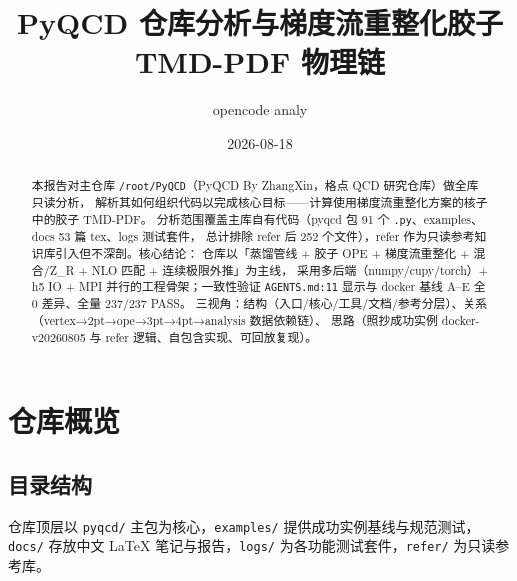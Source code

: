 \documentclass[UTF8]{ctexart}
\title{PyQCD 仓库分析与梯度流重整化胶子 TMD-PDF 物理链}
\author{opencode analy}
\date{2026-08-18}
\begin{document}
\maketitle
\sloppy

\begin{abstract}
本报告对主仓库 \texttt{/root/PyQCD}（PyQCD By ZhangXin，格点 QCD 研究仓库）做全库只读分析，
解析其如何组织代码以完成核心目标——\textcolor{struct}{计算使用梯度流重整化方案的核子中的胶子 TMD-PDF}。
分析范围覆盖主库自有代码（pyqcd 包 91 个 \texttt{.py}、examples、docs 53 篇 tex、logs 测试套件，
总计排除 refer 后 252 个文件），refer 作为只读参考知识库引入但不深剖。核心结论：
仓库以「蒸馏管线 + 胶子 OPE + 梯度流重整化 + 混合/Z\_R + NLO 匹配 + 连续极限外推」为主线，
采用多后端（numpy/cupy/torch）+ h5 IO + MPI 并行的工程骨架；一致性验证
\textcolor{evidence}{\nolinkurl{AGENTS.md:11}} 显示与 docker 基线 A–E 全 0 差异、全量 237/237 PASS。
三视角：结构（入口/核心/工具/文档/参考分层）、关系（vertex→2pt→ope→3pt→4pt→analysis 数据依赖链）、
思路（照抄成功实例 docker-v20260805 与 refer 逻辑、自包含实现、可回放复现）。
\end{abstract}

\tableofcontents

\section{仓库概览}
\subsection{目录结构}
仓库顶层以 \texttt{pyqcd/} 主包为核心，\texttt{examples/} 提供成功实例基线与规范测试，
\texttt{docs/} 存放中文 LaTeX 笔记与报告，\texttt{logs/} 为各功能测试套件，\texttt{refer/} 为只读参考库。

\end{document}
